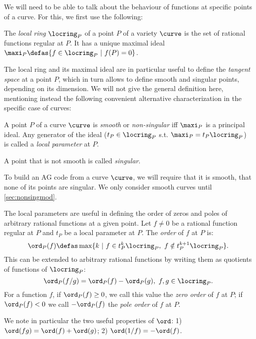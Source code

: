 We will need to be able to talk about the behaviour of functions at specific points of a curve. For this, we first use the following:

\begin{defi}
The \emph{local ring} $\locring_P$ of a point $P$ of a variety $\curve$ is the set of rational functions regular at $P$.
It has a unique maximal ideal $\maxi_P \defas \{f \in \locring_P ~|~ f(P) = 0\}$. 
\end{defi}

The local ring and its maximal ideal are in particular useful to define the \emph{tangent space} at a point $P$, which in turn allows to define smooth and singular points,
depending on its dimension.
We will not give the general definition here, mentioning instead  the following convenient alternative characterization in the specific case of curves:

\begin{defi}
A point $P$ of a curve $\curve$ is \emph{smooth} or \emph{non-singular} iff $\maxi_P$ is a principal ideal. Any generator of the ideal ($t_P \in \locring_P$ s.t. $\maxi_P = t_P\locring_P$)
is called a \emph{local parameter} at $P$.

\noindent
A point that is not smooth is called \emph{singular}.
\end{defi}

To build an AG code from a curve $\curve$, we will require that it is smooth, \ie that none of its points are singular.
We only consider smooth curves until \autoref{sec:nonsingmod}.

The local parameters are useful in defining the order of zeros and poles of arbitrary rational functions at a given point.
Let $f \neq 0$ be a rational function regular at $P$ and $t_P$ be a local parameter at $P$. The \emph{order} of $f$ at $P$ is:
\[
\ord_P(f) \defas \max \{k~ |~ f \in t_P^k\locring_P,~ f \notin t_P^{k+1}\locring_P\}.
\]
This can be extended to arbitrary rational functions by writing them as quotients of functions of $\locring_P$:
\[
\ord_P(f/g) = \ord_P(f) - \ord_P(g),~f,g\in\locring_P.
\]
For a function $f$, if $\ord_P(f) \geq 0$, we call this value the \emph{zero order} of $f$ at $P$; if $\ord_P(f) < 0$
we call $-\ord_P(f)$ the \emph{pole order} of $f$ at $P$.

We note in particular the two useful properties of $\ord$:
1) $\ord(fg) = \ord(f) + \ord(g)$; 2) $\ord(1/f) = -\ord(f)$.

